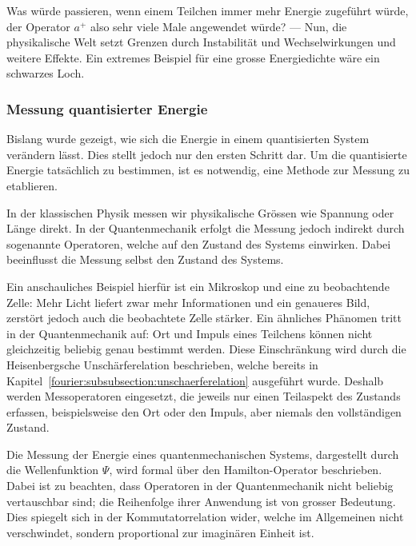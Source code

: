 			Was würde passieren, wenn einem Teilchen immer mehr Energie zugeführt würde, der Operator $a^+$ also sehr viele Male angewendet würde? ---
			Nun, die physikalische Welt setzt Grenzen durch Instabilität und Wechselwirkungen und weitere Effekte.
			Ein extremes Beispiel für eine grosse Energiedichte wäre ein schwarzes Loch.
		
		\subsubsection{Messung quantisierter Energie\label{fourier:subsubsection:MessungQuantisierterEnergie}}
			Bislang wurde gezeigt, wie sich die Energie in einem quantisierten System verändern lässt.
			Dies stellt jedoch nur den ersten Schritt dar.
			Um die quantisierte Energie tatsächlich zu bestimmen, ist es notwendig, eine Methode zur Messung zu etablieren.

			In der klassischen Physik messen wir physikalische Grössen wie Spannung oder Länge direkt.
			In der Quantenmechanik erfolgt die Messung jedoch indirekt durch sogenannte Operatoren, welche auf den Zustand des Systems einwirken.
			Dabei beeinflusst die Messung selbst den Zustand des Systems.

			Ein anschauliches Beispiel hierfür ist ein Mikroskop und eine zu beobachtende Zelle:
			Mehr Licht liefert zwar mehr Informationen und ein genaueres Bild, zerstört jedoch auch die beobachtete Zelle stärker.
			Ein ähnliches Phänomen tritt in der Quantenmechanik auf:
			Ort und Impuls eines Teilchens können nicht gleichzeitig beliebig genau bestimmt werden.
			Diese Einschränkung wird durch die Heisenbergsche Unschärferelation beschrieben, welche bereits in Kapitel~\ref{fourier:subsubsection:unschaerferelation} ausgeführt wurde.
			Deshalb werden Messoperatoren eingesetzt, die jeweils nur einen Teilaspekt des Zustands erfassen, beispielsweise den Ort oder den Impuls, aber niemals den vollständigen Zustand.

			Die Messung der Energie eines quantenmechanischen Systems, dargestellt durch die Wellenfunktion \(\Psi\), wird formal über den Hamilton-Operator beschrieben.
			Dabei ist zu beachten, dass Operatoren in der Quantenmechanik nicht beliebig vertauschbar sind; die Reihenfolge ihrer Anwendung ist von grosser Bedeutung.
			Dies spiegelt sich in der Kommutatorrelation wider, welche im Allgemeinen nicht verschwindet, sondern proportional zur imaginären Einheit ist.

